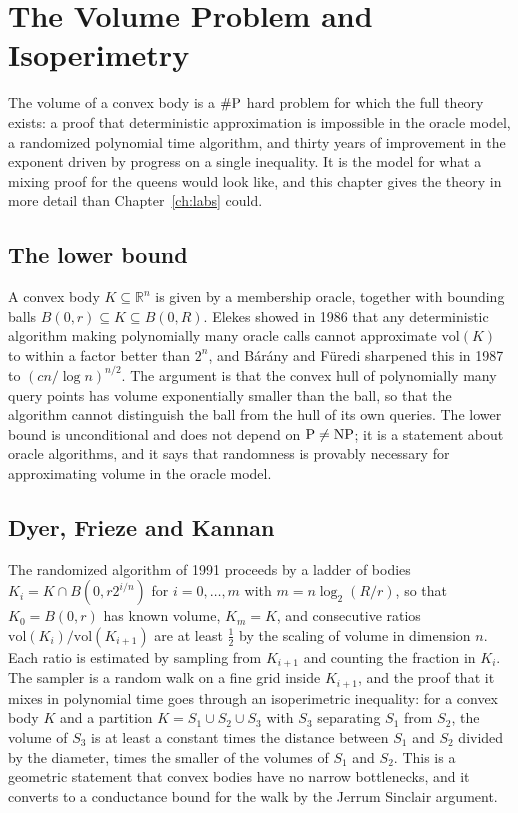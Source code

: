 \chapter{The Volume Problem and Isoperimetry}
\label{ch:volume}

The volume of a convex body is a $\#\mathrm{P}$ hard problem for which the full theory exists: a proof that deterministic approximation is impossible in the oracle model, a randomized polynomial time algorithm, and thirty years of improvement in the exponent driven by progress on a single inequality. It is the model for what a mixing proof for the queens would look like, and this chapter gives the theory in more detail than Chapter~\ref{ch:labs} could.

\section{The lower bound}

A convex body $K \subseteq \mathbb{R}^n$ is given by a membership oracle, together with bounding balls $B(0, r) \subseteq K \subseteq B(0, R)$. Elekes showed in 1986 that any deterministic algorithm making polynomially many oracle calls cannot approximate $\mathrm{vol}(K)$ to within a factor better than $2^{n}$, and B\'ar\'any and F\"uredi sharpened this in 1987 to $(cn / \log n)^{n/2}$. The argument is that the convex hull of polynomially many query points has volume exponentially smaller than the ball, so that the algorithm cannot distinguish the ball from the hull of its own queries. The lower bound is unconditional and does not depend on $\mathrm{P} \neq \mathrm{NP}$; it is a statement about oracle algorithms, and it says that randomness is provably necessary for approximating volume in the oracle model.

\section{Dyer, Frieze and Kannan}

The randomized algorithm of 1991 proceeds by a ladder of bodies $K_i = K \cap B(0, r 2^{i/n})$ for $i = 0, \dots, m$ with $m = n \log_2(R/r)$, so that $K_0 = B(0, r)$ has known volume, $K_m = K$, and consecutive ratios $\mathrm{vol}(K_i) / \mathrm{vol}(K_{i+1})$ are at least $\tfrac12$ by the scaling of volume in dimension $n$. Each ratio is estimated by sampling from $K_{i+1}$ and counting the fraction in $K_i$. The sampler is a random walk on a fine grid inside $K_{i+1}$, and the proof that it mixes in polynomial time goes through an isoperimetric inequality: for a convex body $K$ and a partition $K = S_1 \cup S_2 \cup S_3$ with $S_3$ separating $S_1$ from $S_2$, the volume of $S_3$ is at least a constant times the distance between $S_1$ and $S_2$ divided by the diameter, times the smaller of the volumes of $S_1$ and $S_2$. This is a geometric statement that convex bodies have no narrow bottlenecks, and it converts to a conductance bound for the walk by the Jerrum Sinclair argument.

